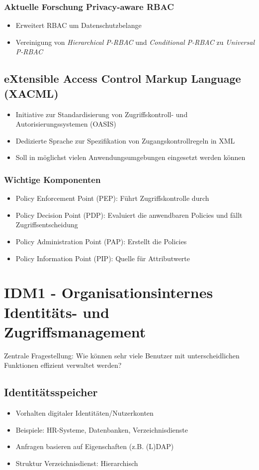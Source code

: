 \subsubsection{Aktuelle Forschung Privacy-aware RBAC}
\begin{itemize}
	\item Erweitert RBAC um Datenschutzbelange
	\item Vereinigung von \textit{Hierarchical P-RBAC} und \textit{Conditional P-RBAC} zu \textit{Universal P-RBAC}
\end{itemize}


\subsection{eXtensible Access Control Markup Language (XACML)}
\begin{itemize}
	\item Initiative zur Standardisierung von Zugriffskontroll- und Autorisierungssystemen (OASIS)
	\item Dedizierte Sprache zur Spezifikation von Zugangskontrollregeln in XML
	\item Soll in möglichst vielen Anwendungsumgebungen eingesetzt werden können
\end{itemize}

\subsubsection{Wichtige Komponenten}
\begin{itemize}
	\item Policy Enforcement Point (PEP): Führt Zugriffskontrolle durch
	\item Policy Decision Point (PDP): Evaluiert die anwendbaren Policies und fällt Zugriffsentscheidung
	\item Policy Administration Point (PAP): Erstellt die Policies
	\item Policy Information Point (PIP): Quelle für Attributwerte
\end{itemize}



\section{IDM1 - Organisationsinternes Identitäts- und Zugriffsmanagement}
Zentrale Fragestellung: Wie können sehr viele Benutzer mit unterscheidlichen Funktionen effizient verwaltet werden?

\subsection{Identitätsspeicher}
\begin{itemize}
	\item Vorhalten digitaler Identitäten/Nutzerkonten
	\item Beispiele: HR-Systeme, Datenbanken, Verzeichnisdienste
	\item Anfragen basieren auf Eigenschaften (z.B. (L)DAP)
	\item Struktur Verzeichnisdienst: Hierarchisch
\end{itemize}


